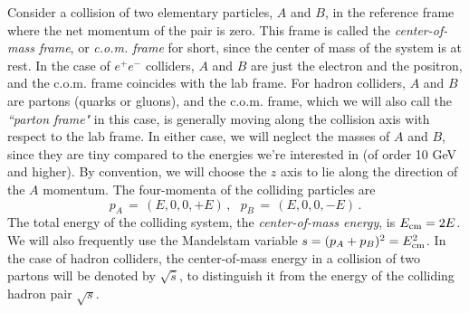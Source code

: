 \documentclass{ws-procs9x6}
\def\beq{\begin{equation}}
\def\eeq#1{\label{#1}\end{equation}}
\begin{document}
Consider a collision of two elementary particles, $A$ and $B$, in the reference frame where the net momentum of the pair is zero. This frame is called the {\it center-of-mass frame}, or {\it c.o.m. frame} for short, since the center of mass of the system is at rest. In the case of $e^+e^-$ colliders, $A$ and $B$ are just the electron and the positron, and the c.o.m. frame coincides with the lab frame. For hadron colliders, $A$ and $B$ are partons (quarks or gluons), and the c.o.m. frame, which we will also call the {\it ``parton frame"} in this case, is generally moving along the collision axis with respect to the lab frame. In either case, we will neglect the masses of $A$ and $B$, since they are tiny compared to the energies we're interested in (of order 10 GeV and higher). By convention, we will choose the $z$ axis to lie along the direction of the $A$ momentum. The four-momenta of the colliding particles are 
\beq
p_A \,=\, (E,0,0,+E)\,,~~~p_B \,=\, (E,0,0,-E)\,.
\eeq{pin}
The total energy of the colliding system, the {\it center-of-mass energy}, is $E_{\rm cm} = 2E$. We will also frequently use the Mandelstam variable $s
=(p_A+p_B)^2 = E_{\rm cm}^2$. In the case of hadron colliders, the center-of-mass energy in a collision of two partons will be denoted by $\sqrt{\hat{s}}$, to distinguish it from the energy of the colliding hadron pair $\sqrt{s}$. 
\end{document}
